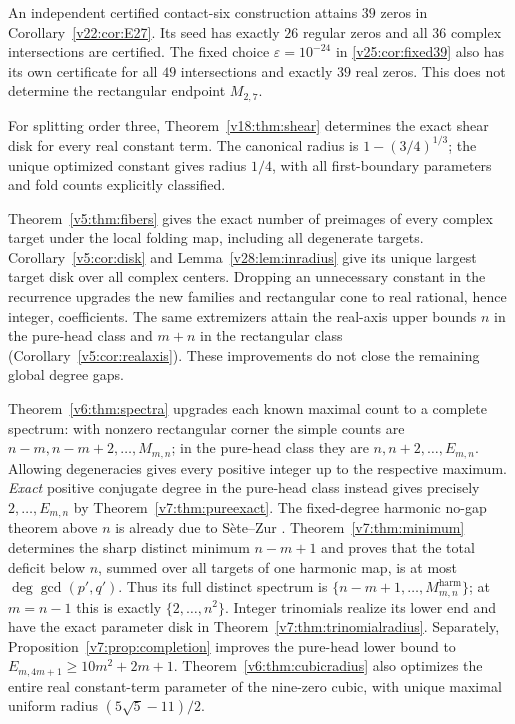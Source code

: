 \documentclass[UTF8,11pt]{ctexart}
\theoremstyle{definition}
\numberwithin{equation}{section}
\begin{document}
An independent certified contact-six construction attains $39$
zeros in Corollary~\ref{v22:cor:E27}. Its seed has exactly $26$
regular zeros and all
$36$ complex intersections are certified. The fixed choice
$\varepsilon=10^{-24}$ in \eqref{v25:cor:fixed39} also has its
own certificate for all $49$ intersections and exactly $39$ real
zeros. This does not determine the rectangular endpoint $M_{2,7}$.

For splitting order three, Theorem~\ref{v18:thm:shear} determines
the exact shear disk for every real constant term. The canonical
radius is $1-(3/4)^{1/3}$; the unique optimized constant gives
radius $1/4$, with all first-boundary parameters and fold counts
explicitly classified.

Theorem~\ref{v5:thm:fibers} gives the exact number of preimages
of every complex target under the local folding map, including all
degenerate targets. Corollary~\ref{v5:cor:disk} and Lemma~\ref{v28:lem:inradius}
give its unique largest target disk over all complex centers. Dropping an unnecessary constant in the
recurrence upgrades the new families and rectangular cone to real
rational, hence integer, coefficients. The same extremizers attain
the real-axis upper bounds $n$ in the pure-head class and $m+n$
in the rectangular class (Corollary~\ref{v5:cor:realaxis}).
These improvements do not close the remaining global degree gaps.

Theorem~\ref{v6:thm:spectra} upgrades each known maximal count to
a complete spectrum: with nonzero rectangular corner the simple counts
are $n-m,n-m+2,\ldots,M_{m,n}$; in the pure-head class they are
$n,n+2,\ldots,E_{m,n}$. Allowing degeneracies gives every positive
integer up to the respective maximum.
\emph{Exact} positive conjugate degree in the pure-head class instead
gives precisely $2,\ldots,E_{m,n}$ by Theorem~\ref{v7:thm:pureexact}.
The fixed-degree harmonic
no-gap theorem above $n$ is already due to S\`ete--Zur \cite{SZ21}.
Theorem~\ref{v7:thm:minimum} determines the sharp distinct minimum
$n-m+1$ and proves that the total deficit below $n$, summed over
all targets of one harmonic map, is at most $\deg\gcd(p',q')$.
Thus its full distinct spectrum is
$\{n-m+1,\ldots,M^{\mathrm{harm}}_{m,n}\}$; at $m=n-1$ this
is exactly $\{2,\ldots,n^2\}$. Integer trinomials realize its
lower end and have the exact parameter disk in
Theorem~\ref{v7:thm:trinomialradius}. Separately,
Proposition~\ref{v7:prop:completion} improves the pure-head lower
bound to $E_{m,4m+1}\ge10m^2+2m+1$.
Theorem~\ref{v6:thm:cubicradius} also optimizes the entire real
constant-term parameter of the nine-zero cubic, with unique maximal
uniform radius $(5\sqrt5-11)/2$.
\end{document}
